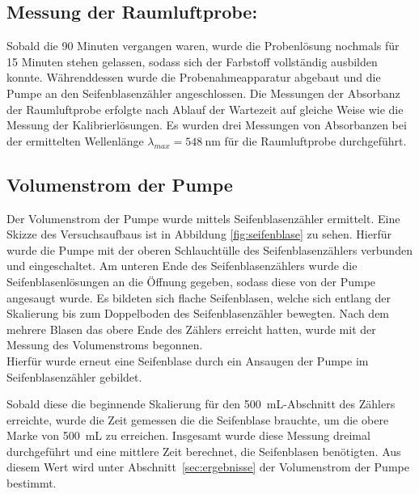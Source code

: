 \subsection*{Messung der Raumluftprobe:}
Sobald die 90 Minuten vergangen waren, wurde die Probenlösung nochmals für 15 Minuten stehen gelassen, sodass sich der Farbstoff vollständig ausbilden konnte. Währenddessen wurde die Probenahmeapparatur abgebaut und die Pumpe an den Seifenblasenzähler angeschlossen.
Die Messungen der Absorbanz der Raumluftprobe erfolgte nach Ablauf der Wartezeit auf gleiche Weise wie die Messung der Kalibrierlösungen. Es wurden drei Messungen von Absorbanzen bei der ermittelten Wellenlänge $\lambda_{max}=\SI{548}{\nano\meter}$ für die Raumluftprobe durchgeführt.

\subsection*{Volumenstrom der Pumpe}
Der Volumenstrom der Pumpe wurde mittels Seifenblasenzähler ermittelt. Eine Skizze des Versuchsaufbaus ist in Abbildung \ref{fig:seifenblase} zu sehen. Hierfür wurde die Pumpe mit der oberen Schlauchtülle des Seifenblasenzählers verbunden und eingeschaltet. Am unteren Ende des Seifenblasenzählers wurde die Seifenblasenlösungen an die Öffnung gegeben, sodass diese von der Pumpe angesaugt wurde. Es bildeten sich flache Seifenblasen, welche sich entlang der Skalierung bis zum Doppelboden des Seifenblasenzähler bewegten. Nach dem mehrere Blasen das obere Ende des Zählers erreicht hatten, wurde mit der Messung des Volumenstroms begonnen.\\
Hierfür wurde erneut eine Seifenblase durch ein Ansaugen der Pumpe im Seifenblasenzähler gebildet. 
\newpage

Sobald diese die beginnende Skalierung für den \SI{500}{\milli \liter}-Abschnitt des Zählers erreichte, wurde die Zeit gemessen die die Seifenblase brauchte, um die obere Marke von \SI{500}{\milli \liter} zu erreichen. Insgesamt wurde diese Messung dreimal durchgeführt und eine mittlere Zeit berechnet, die Seifenblasen benötigten. Aus diesem Wert wird unter \mbox{Abschnitt \ref{sec:ergebnisse}} der Volumenstrom der Pumpe bestimmt.


